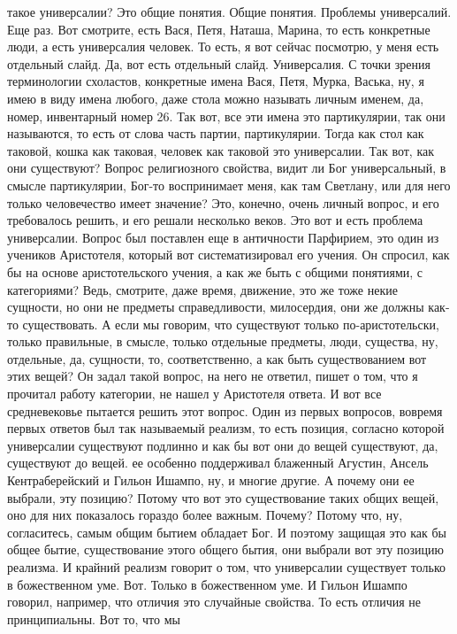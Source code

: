 такое универсалии? Это общие понятия. Общие понятия. Проблемы универсалий. Еще
раз. Вот смотрите, есть Вася, Петя, Наташа, Марина, то есть конкретные люди, а
есть универсалия человек. То есть, я вот сейчас посмотрю, у меня есть отдельный
слайд. Да, вот есть отдельный слайд. Универсалия. С точки зрения терминологии
схоластов, конкретные имена Вася, Петя, Мурка, Васька, ну, я имею в виду имена
любого, даже стола можно называть личным именем, да, номер, инвентарный номер
26. Так вот, все эти имена это партикулярии, так они называются, то есть от
слова часть партии, партикулярии. Тогда как стол как таковой, кошка как таковая,
человек как таковой это универсалии. Так вот, как они существуют? Вопрос
религиозного свойства, видит ли Бог универсальный, в смысле партикулярии, Бог-то
воспринимает меня, как там Светлану, или для него только человечество имеет
значение? Это, конечно, очень личный вопрос, и его требовалось решить, и его
решали несколько веков. Это вот и есть проблема универсалии. Вопрос был
поставлен еще в античности Парфирием, это один из учеников Аристотеля, который
вот систематизировал его учения. Он спросил, как бы на основе аристотельского
учения, а как же быть с общими понятиями, с категориями? Ведь, смотрите, даже
время, движение, это же тоже некие сущности, но они не предметы справедливости,
милосердия, они же должны как-то существовать. А если мы говорим, что существуют
только по-аристотельски, только правильные, в смысле, только отдельные предметы,
люди, существа, ну, отдельные, да, сущности, то, соответственно, а как быть
существованием вот этих вещей? Он задал такой вопрос, на него не ответил, пишет
о том, что я прочитал работу категории, не нашел у Аристотеля ответа. И вот все
средневековье пытается решить этот вопрос. Один из первых вопросов, вовремя
первых ответов был так называемый реализм, то есть позиция, согласно которой
универсалии существуют подлинно и как бы вот они до вещей существуют, да,
существуют до вещей. ее особенно поддерживал блаженный Агустин, Ансель
Кентраберейский и Гильон Ишампо, ну, и многие другие. А почему они ее выбрали,
эту позицию? Потому что вот это существование таких общих вещей, оно для них
показалось гораздо более важным. Почему? Потому что, ну, согласитесь, самым
общим бытием обладает Бог. И поэтому защищая это как бы общее бытие,
существование этого общего бытия, они выбрали вот эту позицию реализма. И
крайний реализм говорит о том, что универсалии существует только в божественном
уме. Вот. Только в божественном уме. И Гильон Ишампо говорил, например, что
отличия это случайные свойства. То есть отличия не принципиальны. Вот то, что мы
